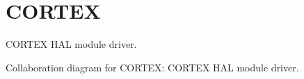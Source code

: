 \hypertarget{group__CORTEX}{}\section{C\+O\+R\+T\+EX}
\label{group__CORTEX}


C\+O\+R\+T\+EX H\+AL module driver.  


Collaboration diagram for C\+O\+R\+T\+EX\+:
C\+O\+R\+T\+EX H\+AL module driver. 

